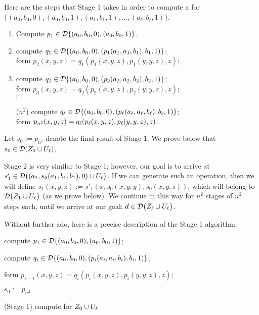 Here are the steps that Stage 1 takes in order to compute a \ldto for 
$\{(a_0, b_0,0),(a_0, b_0,1),(a_1, b_1,1), \dots, (a_{\ell}, b_{\ell},1)\}$.
\begin{enumerate}
  \item Compute $p_1 \in \mathcal{D} \{(a_0, b_0, 0), (a_0, b_0, 1)\}$.\\[-8pt]    
  \item compute $q_1\in \mathcal{D} \{(a_0, b_0, 0), (p_1(a_1, a_1, b_1), b_1, 1)\}$; \\
  form $p_2(x,y,z) = q_1(p_1(x,y,z), p_1(y,y,z), z)$;\\[-8pt]    
  \item compute $q_2\in \mathcal{D} \{(a_0, b_0, 0), (p_2(a_2, a_2, b_2), b_2, 1)\}$; \\
    form $p_3(x,y,z) = q_2(p_2(x,y,z), p_2(y,y,z), z)$;\\
  $\vdots$
  \item[($n^2$)] compute $q_{\ell}\in \mathcal{D} \{(a_0, b_0, 0),  (p_{\ell}(a_{\ell}, a_{\ell}, b_{\ell}), b_{\ell}, 1)\}$; \\
  form $p_{n^2}(x,y,z) = q_{\ell}(p_{\ell}(x,y,z), p_{\ell}(y,y,z), z)$.
\end{enumerate}
Let $s_0 := p_{n^2}$ denote the final result of Stage 1.
We prove below that $s_0 \in \mathcal{D} (Z_0 \cup U_{\ell})$.

Stage 2 is very similar to Stage 1; however, our goal is to arrive at $s'_1 \in 
\mathcal{D} \bigl((a_1, s_0(a_1, b_1, b_1), 0) \cup U_{\ell}\bigr)$. If we can generate 
such an operation, then we will define $s_1(x,y,z) := s'_1(x, s_0(x,y,y), s_0(x,y,z))$, which will
belong to $\mathcal{D} \bigl(Z_1 \cup U_{\ell}\bigr)$ (as we prove below).
We continue in this way for $n^2$ stages of $n^2$ steps each, until we arrive at 
our goal: $d \in \mathcal{D} \bigl(Z_{\ell} \cup U_{\ell}\bigr)$.

Without further ado, here is a precise description of the Stage 1 algorithm.
\begin{algorithm}
  
  compute $p_1 \in \mathcal{D} \{(a_0, b_0, 0), (a_0, b_0, 1)\}$;
  
   {
    compute $q_i\in \mathcal{D} \{(a_0, b_0, 0), (p_i(a_i, a_i, b_i), b_i, 1)\}$;
  
    form $p_{i+1}(x,y,z) = q_i(p_i(x,y,z), p_i(y,y,z), z)$;
  }

  \Return $s_0:=p_{n^2}$
  \caption{(Stage 1) compute \ldto for $Z_0 \cup U_{\ell}$\label{alg:new-2-1}}
\end{algorithm}  


